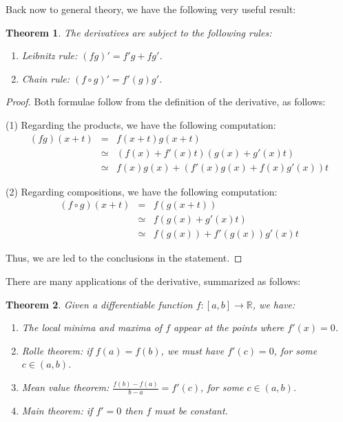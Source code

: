 \documentclass[12pt]{amsbook}
\newtheorem{theorem}{Theorem}[chapter]
\begin{document}
Back now to general theory, we have the following very useful result:


\begin{theorem}
The derivatives are subject to the following rules:
\begin{enumerate}
\item Leibnitz rule: $(fg)'=f'g+fg'$.

\item Chain rule: $(f\circ g)'=f'(g)g'$.
\end{enumerate}
\end{theorem}

\begin{proof}
Both formulae follow from the definition of the derivative, as follows:

\medskip

(1) Regarding the products, we have the following computation:
\begin{eqnarray*}
(fg)(x+t)
&=&f(x+t)g(x+t)\\
&\simeq&(f(x)+f'(x)t)(g(x)+g'(x)t)\\
&\simeq&f(x)g(x)+(f'(x)g(x)+f(x)g'(x))t
\end{eqnarray*}

(2) Regarding compositions, we have the following computation:
\begin{eqnarray*}
(f\circ g)(x+t)
&=&f(g(x+t))\\
&\simeq&f(g(x)+g'(x)t)\\
&\simeq&f(g(x))+f'(g(x))g'(x)t
\end{eqnarray*}

Thus, we are led to the conclusions in the statement.
\end{proof}

There are many applications of the derivative, summarized as follows:


\begin{theorem}
Given a differentiable function $f:[a,b]\to\mathbb R$, we have:
\begin{enumerate}
\item The local minima and maxima of $f$ appear at the points where $f'(x)=0$.

\item Rolle theorem: if $f(a)=f(b)$, we must have $f'(c)=0$, for some $c\in(a,b)$. 

\item Mean value theorem: $\frac{f(b)-f(a)}{b-a}=f'(c)$, for some $c\in(a,b)$.

\item Main theorem: if $f'=0$ then $f$ must be constant.
\end{enumerate}
\end{theorem}
\end{document}
